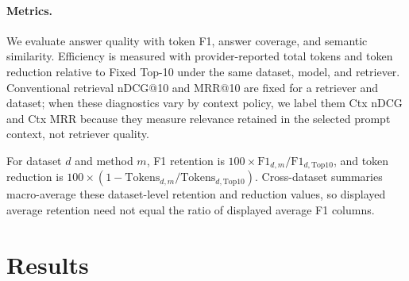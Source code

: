 \documentclass[11pt]{article}
\begin{document}
\begin{table}[t]
\centering
\small
\caption{Compared context-selection methods.}
\label{tab:methods}
\end{table}

\paragraph{Metrics.}
We evaluate answer quality with token F1, answer coverage, and semantic similarity. Efficiency is measured with provider-reported total tokens and token reduction relative to Fixed Top-10 under the same dataset, model, and retriever. Conventional retrieval nDCG@10 and MRR@10 are fixed for a retriever and dataset; when these diagnostics vary by context policy, we label them Ctx nDCG and Ctx MRR because they measure relevance retained in the selected prompt context, not retriever quality.

For dataset $d$ and method $m$, F1 retention is $100 \times \mathrm{F1}_{d,m}/\mathrm{F1}_{d,\mathrm{Top10}}$, and token reduction is $100 \times (1-\mathrm{Tokens}_{d,m}/\mathrm{Tokens}_{d,\mathrm{Top10}})$. Cross-dataset summaries macro-average these dataset-level retention and reduction values, so displayed average retention need not equal the ratio of displayed average F1 columns.

\section{Results}
\end{document}
